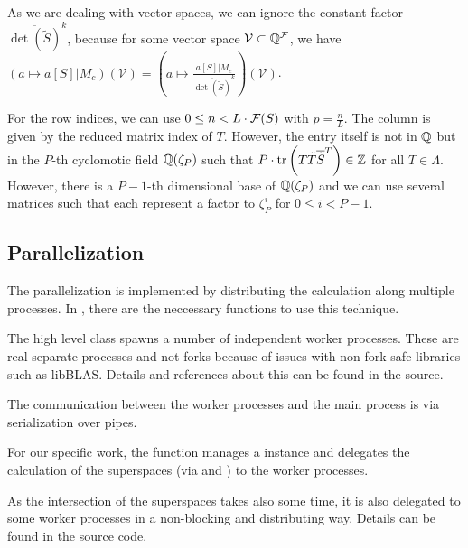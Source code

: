 As we are dealing with vector spaces, we can ignore the constant factor $\overline{\det(\tilde{S})}^k$, because for some vector space $\mathcal{V} \subset \mathbb{Q}^{\mathcal{F}}$, we have $(a \mapsto a[S]| M_c) (\mathcal{V}) = (a \mapsto \frac{a[S]| M_c}{\overline{\det(\tilde{S})}^k}) (\mathcal{V})$.

For the row indices, we can use $0 \le n < L \cdot \mathcal{F}(S)$ with $p = \frac{n}{L}$. The column is given by the reduced matrix index of $T$. However, the entry itself is not in $\mathbb{Q}$ but in the $P$-th cyclomotic field $\mathbb{Q}(\zeta_P)$ such that $P \cdot \textup{\textrm{tr}}\left(T \tilde{T} \overline{\tilde{S}}^T\right) \in \mathbb{Z}$ for all $T \in \Lambda$. However, there is a $P-1$-th dimensional base of $\mathbb{Q}(\zeta_P)$ and we can use several matrices such that each represent a factor to $\zeta_P^i$ for $0 \le i < P - 1$.


\subsection{Parallelization}
\label{impl:parallelization}

The parallelization is implemented by distributing the calculation along multiple processes. In , there are the neccessary functions to use this technique.

The high level class  spawns a number of independent worker processes. These are real separate processes and not forks because of issues with non-fork-safe libraries such as libBLAS. Details and references about this can be found in the source.

The communication between the worker processes and the main process is via serialization over pipes.

For our specific work, the function  manages a  instance and delegates the calculation of the superspaces (via  and ) to the worker processes.

As the intersection of the superspaces takes also some time, it is also delegated to some worker processes in a non-blocking and distributing way. Details can be found in the source code.

